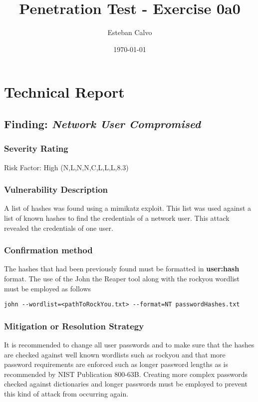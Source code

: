 \documentclass[notitlepage]{article}
\begin{document}
  
\title{Penetration Test - Exercise 0a0}
\author{Esteban Calvo}
\date{\isodate\today}

\maketitle

\tableofcontents

\newpage
\section{Technical Report}

  \subsection{Finding: \emph{Network User Compromised}}
	\subsubsection*{Severity Rating}
	Risk Factor: High
    \cvss(N,L,N,N,C,L,L,L,8.3)
		
  	\subsubsection*{Vulnerability Description}
  		A list of hashes was found using a mimikatz exploit. This list was used against
        a list of known hashes to find the credentials of a network user. This attack revealed
        the credentials of one user. 

  	\subsubsection*{Confirmation method}
  	The hashes that had been previously found must be formatted in \textbf{user:hash} format. The use
    of the John the Reaper tool along with the rockyou wordlist must be employed as follows
    \begin{verbatim}
john --wordlist=<pathToRockYou.txt> --format=NT passwordHashes.txt
    \end{verbatim}
    
    \subsubsection*{Mitigation or Resolution Strategy}
    It is recommended to change all user passwords and to make sure that the hashes are checked against
    well known wordlists such as rockyou and that more password requirements are enforced such as longer password
    lengths as is recommended by NIST Publication 800-63B. Creating more complex passwords checked against
    dictionaries and longer passwords must be employed to prevent this kind of attack from occurring again.
\end{document}
